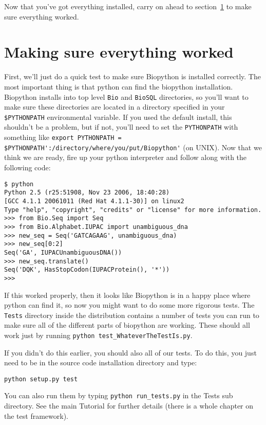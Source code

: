 \documentclass{article}
\begin{document}
Now that you've got everything installed, carry on ahead to section~\ref{sec:is_working} to make sure everything worked.

\section{Making sure everything worked}
\label{sec:is_working}

First, we'll just do a quick test to make sure Biopython is installed correctly. The most important thing is that python can find the biopython installation. Biopython installs into top level \verb|Bio| and \verb|BioSQL| directories, so you'll want to make sure these directories are located in a directory specified 
in your\verb| $PYTHONPATH| environmental variable. If you used the default install, this shouldn't be a problem, but if not, you'll need to set the \verb|PYTHONPATH| with something like \verb|export PYTHONPATH = $PYTHONPATH':/directory/where/you/put/Biopython'| (on UNIX). Now that we think we are ready, fire up your python interpreter and follow along with the following code:

\begin{verbatim}
$ python
Python 2.5 (r25:51908, Nov 23 2006, 18:40:28) 
[GCC 4.1.1 20061011 (Red Hat 4.1.1-30)] on linux2
Type "help", "copyright", "credits" or "license" for more information.
>>> from Bio.Seq import Seq
>>> from Bio.Alphabet.IUPAC import unambiguous_dna
>>> new_seq = Seq('GATCAGAAG', unambiguous_dna)
>>> new_seq[0:2]
Seq('GA', IUPACUnambiguousDNA())
>>> new_seq.translate()
Seq('DQK', HasStopCodon(IUPACProtein(), '*'))
>>>
\end{verbatim}

If this worked properly, then it looks like Biopython is in a happy place where python can find it, so now you might want to do some more rigorous tests. The \verb|Tests| directory inside the distribution contains a number of tests you can run to make sure all of the different parts of biopython are working. These should all work just by running \verb|python test_WhateverTheTestIs.py|. 

If you didn't do this earlier, you should also all of our tests. To do this, you just need to be in the source code installation directory and type:

\begin{verbatim}
python setup.py test
\end{verbatim}

You can also run them by typing \verb|python run_tests.py| in the Tests sub directory.
See the main Tutorial for further details (there is a whole chapter on the test framework).
\end{document}
